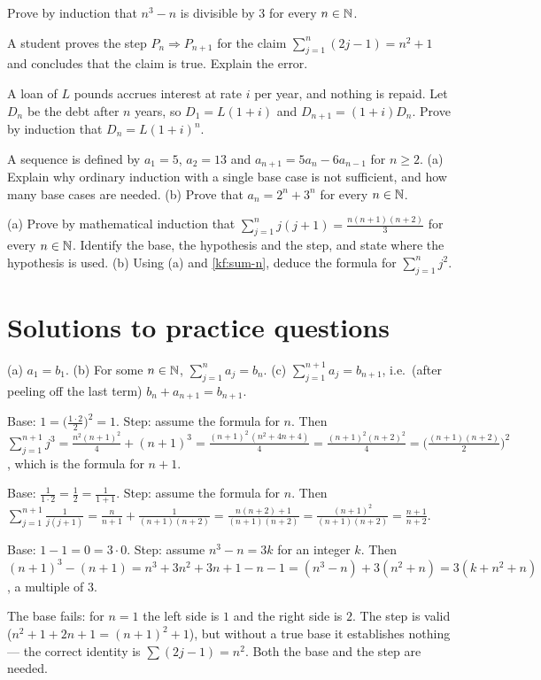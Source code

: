 \pq[mathematical] Prove by induction that $n^3-n$ is divisible by $3$ for every $n\in\mathbb{N}$.

\pq[conceptual] A student proves the step $P_n\Rightarrow P_{n+1}$ for the claim $\sum_{j=1}^{n}(2j-1)=n^2+1$ and concludes
that the claim is true. Explain the error.

\pq[application] A loan of $L$ pounds accrues interest at rate $i$ per year, and nothing is repaid. Let $D_n$ be the debt
after $n$ years, so $D_1=L(1+i)$ and $D_{n+1}=(1+i)D_n$. Prove by induction that $D_n=L(1+i)^n$.

 A sequence is defined by $a_1=5$, $a_2=13$ and $a_{n+1}=5a_n-6a_{n-1}$ for $n\ge2$. (a) Explain why ordinary
induction with a single base case is not sufficient, and how many base cases are needed. (b) Prove that $a_n=2^n+3^n$
for every $n\in\mathbb{N}$.

 (a) Prove by mathematical induction that $\sum_{j=1}^{n}j(j+1)=\frac{n(n+1)(n+2)}{3}$ for every $n\in\mathbb{N}$.
Identify the base, the hypothesis and the step, and state where the hypothesis is used.
(b) Using (a) and \cref{kf:sum-n}, deduce the formula for $\sum_{j=1}^n j^2$.

\section{Solutions to practice questions}
(a) $a_1=b_1$. (b) For some $n\in\mathbb{N}$, $\sum_{j=1}^{n}a_j=b_n$. (c) $\sum_{j=1}^{n+1}a_j=b_{n+1}$, i.e.\ (after peeling off the
last term) $b_n+a_{n+1}=b_{n+1}$.

Base: $1=\big(\frac{1\cdot2}{2}\big)^2=1$. Step: assume the formula for $n$. Then
$\sum_{j=1}^{n+1}j^3=\frac{n^2(n+1)^2}{4}+(n+1)^3=\frac{(n+1)^2\,(n^2+4n+4)}{4}=\frac{(n+1)^2(n+2)^2}{4}
=\Big(\frac{(n+1)(n+2)}2\Big)^2$, which is the formula for $n+1$.

Base: $\frac1{1\cdot2}=\frac12=\frac{1}{1+1}$. Step: assume the formula for $n$. Then
$\sum_{j=1}^{n+1}\frac1{j(j+1)}=\frac n{n+1}+\frac1{(n+1)(n+2)}=\frac{n(n+2)+1}{(n+1)(n+2)}=\frac{(n+1)^2}{(n+1)(n+2)}=\frac{n+1}{n+2}$.

Base: $1-1=0=3\cdot0$. Step: assume $n^3-n=3k$ for an integer $k$. Then
$(n+1)^3-(n+1)=n^3+3n^2+3n+1-n-1=(n^3-n)+3(n^2+n)=3(k+n^2+n)$, a multiple of $3$.

The base fails: for $n=1$ the left side is $1$ and the right side is $2$. The step is valid ($n^2+1+2n+1=(n+1)^2+1$), but
without a true base it establishes nothing --- the correct identity is $\sum(2j-1)=n^2$. Both the base and the step are
needed.

